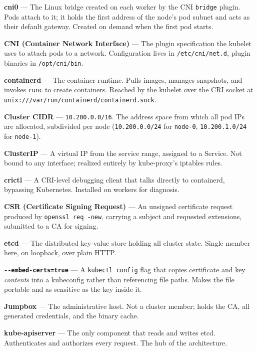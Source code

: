 \documentclass[11pt,oneside]{report}
\begin{document}
\textbf{cni0} ---
The Linux bridge
created on each
worker by the CNI
\texttt{bridge}
plugin. Pods attach
to it; it holds the
first address of the
node's pod subnet
and acts as their
default gateway.
Created on demand
when the first pod
starts.

\textbf{CNI
(Container Network
Interface)} --- The
plugin specification
the kubelet uses to
attach pods to a
network.
Configuration lives
in
\texttt{/etc/cni/net.d},
plugin binaries in
\texttt{/opt/cni/bin}.

\textbf{containerd}
--- The container
runtime. Pulls
images, manages
snapshots, and
invokes
\texttt{runc} to
create containers.
Reached by the
kubelet over the CRI
socket at
\texttt{unix:}\allowbreak{}\texttt{/}\allowbreak{}\texttt{/}\allowbreak{}\texttt{/}\allowbreak{}\texttt{var/}\allowbreak{}\texttt{run/}\allowbreak{}\texttt{containerd/}\allowbreak{}\texttt{containerd.}\allowbreak{}\texttt{sock}.

\textbf{Cluster
CIDR} ---
\texttt{10.200.0.0/16}.
The address space
from which all pod
IPs are allocated,
subdivided per node
(\texttt{10.200.0.0/24}
for \texttt{node-0},
\texttt{10.200.1.0/24}
for
\texttt{node-1}).

\textbf{ClusterIP}
--- A virtual IP
from the service
range, assigned to a
Service. Not bound
to any interface;
realized entirely by
kube-proxy's
iptables rules.

\textbf{crictl} ---
A CRI-level
debugging client
that talks directly
to containerd,
bypassing
Kubernetes.
Installed on workers
for diagnosis.

\textbf{CSR
(Certificate Signing
Request)} --- An
unsigned certificate
request produced by
\texttt{openssl\ req\ -}\allowbreak{}\texttt{new},
carrying a subject
and requested
extensions,
submitted to a CA
for signing.

\textbf{etcd} ---
The distributed
key-value store
holding all cluster
state. Single member
here, on loopback,
over plain HTTP.

\textbf{\texttt{-\/-embed-}\allowbreak{}\texttt{certs=true}}
--- A
\texttt{kubectl\ config}
flag that copies
certificate and key
\emph{contents} into
a kubeconfig rather
than referencing
file paths. Makes
the file portable
and as sensitive as
the key inside it.

\textbf{Jumpbox} ---
The administrative
host. Not a cluster
member; holds the
CA, all generated
credentials, and the
binary cache.

\textbf{kube-apiserver}
--- The only
component that reads
and writes etcd.
Authenticates and
authorizes every
request. The hub of
the architecture.
\end{document}
